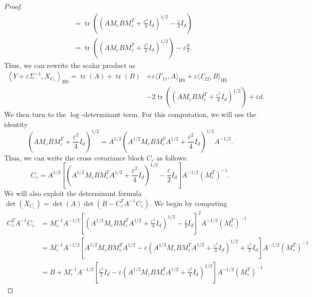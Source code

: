 \documentclass[]{article}
\DeclareMathOperator{\tr}{tr}
\DeclareMathOperator{\HS}{HS}
\numberwithin{equation}{section}
\theoremstyle{plain}
\begin{document}
\begin{proof}
\begin{align*}
    & = \tr\left(\left( AM_{\varepsilon}BM_{\varepsilon}^T+\frac{\varepsilon^2}{4}I_d\right)^{1/2} - \frac{\varepsilon}{2}I_d   \right)\\
    & =  \tr\left(  \left( AM_{\varepsilon}BM_{\varepsilon}^T+\frac{\varepsilon^2}{4}I_d\right)^{1/2}  \right) - \varepsilon\frac{d}{2}.
\end{align*}
Thus, we can rewrite the scalar product as
\begin{align}
    \left\langle Y + \varepsilon \Sigma^{-1}, X_{C_\varepsilon}
         \right\rangle_{\HS} = \tr(A) + \tr(B)& + \varepsilon  \langle \Gamma_{11}, A \rangle_{\HS} + \varepsilon \langle \Gamma_{22}, B \rangle_{\HS} \nonumber\\
         &- 2\tr\left(  \left( AM_{\varepsilon}BM_{\varepsilon}^T+\frac{\varepsilon^2}{4}I_d\right)^{1/2}  \right) + \varepsilon d.
\end{align}
We then turn to the $\log$-determinant term. For this computation, we will use the identity
\begin{equation*}
    \left( AM_{\varepsilon}BM_{\varepsilon}^T+ \frac{\varepsilon^2}{4} I_d\right)^{1/2} = A^{1/2}\left(A^{1/2}M_{\varepsilon}B M_{\varepsilon}^TA^{1/2}+ \frac{\varepsilon^2}{4}I_d \right)^{1/2}A^{-1/2}.
\end{equation*}
Thus, we can write the cross covariance block $C_\varepsilon$ as follows:
\begin{equation*}
    C_\varepsilon = A^{1/2} \left[\left(A^{1/2}M_{\varepsilon}B M_{\varepsilon}^TA^{1/2}+ \frac{\varepsilon^2}{4}I_d \right)^{1/2}- \frac{\varepsilon}{2}I_d   \right]A^{-1/2}(M_{\varepsilon}^T)^{-1}.
\end{equation*}
We will also exploit the determinant formula
$
    \det(X_{C_\varepsilon}) = \det(A)\det(B - C_\varepsilon^TA^{-1} C_\varepsilon).
$ 
We begin by computing 
\begin{align*}
C_\varepsilon^TA^{-1} C_\varepsilon & = M_\varepsilon^{-1}A^{-1/2}\left[\left(A^{1/2}M_{\varepsilon}B M_{\varepsilon}^TA^{1/2}+ \frac{\varepsilon^2}{4}I_d \right)^{1/2}- \frac{\varepsilon}{2}I_d   \right]^{2}A^{-1/2} (M_{\varepsilon}^T)^{-1} \\
& = M_\varepsilon^{-1}A^{-1/2}\left[A^{1/2}M_{\varepsilon}B M_{\varepsilon}^TA^{1/2} - \varepsilon \left(A^{1/2}M_{\varepsilon}B M_{\varepsilon}^TA^{1/2}+ \frac{\varepsilon^2}{4}I_d \right)^{1/2}+ \frac{\varepsilon^2}{2}I_d   \right]A^{-1/2} (M_{\varepsilon}^T)^{-1} \\
& = B+ M_{\varepsilon}^{-1}A^{-1/2}\left[\frac{\varepsilon^2}{2}I_d - \varepsilon \left(A^{1/2}M_{\varepsilon}B M_{\varepsilon}^TA^{1/2}+ \frac{\varepsilon^2}{4}I_d \right)^{1/2} \right]A^{-1/2} (M_{\varepsilon}^T)^{-1} 

\end{align*}
\end{proof}
\end{document}

